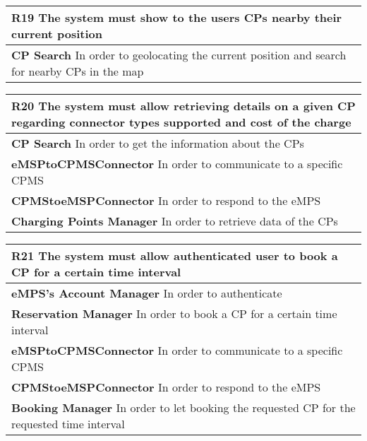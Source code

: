 \begin{table}[H]
    \begin{tabularx}{\textwidth}{X}
        \toprule
        \textbf{R19} The system must show to the users CPs nearby their current position                \\ \midrule
        \textbf{CP Search} In order to geolocating the current position and search for nearby CPs in the map \\ 
    \end{tabularx}
\end{table}
\begin{table}[H]
    \begin{tabularx}{\textwidth}{X}
        \toprule
        \textbf{R20} 
        The system must allow retrieving details on a given CP regarding connector
        types supported and cost of the charge                        \\ \midrule
        \textbf{CP Search} In order to get the information about the CPs \\ 
        \textbf{eMSPtoCPMSConnector} In order to communicate to a specific CPMS \\ 
        \textbf{CPMStoeMSPConnector} In order to respond to the eMPS \\ 
        \textbf{Charging Points Manager} In order to retrieve data of the CPs \\
    \end{tabularx}
\end{table}
\begin{table}[H]
    \begin{tabularx}{\textwidth}{X}
        \toprule
        \textbf{R21} The system must allow authenticated user to book a CP for a certain time interval                \\ \midrule
        \textbf{eMPS's Account Manager} In order to authenticate\\                                                                                      
        \textbf{Reservation Manager} In order to book a CP for a certain time interval \\ 
        \textbf{eMSPtoCPMSConnector} In order to communicate to a specific CPMS \\ 
        \textbf{CPMStoeMSPConnector} In order to respond to the eMPS \\ 
        \textbf{Booking Manager} In order to let booking the requested CP for the requested time interval \\              
    \end{tabularx}
\end{table}

